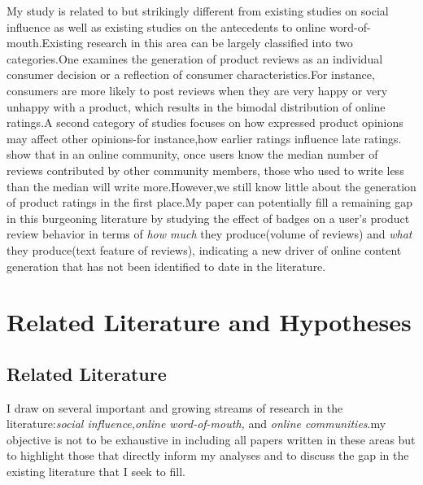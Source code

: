 \documentclass[12pt]{article}%
\begin{document}
My study is related to but strikingly different from existing studies on social influence as well as existing studies on the antecedents to online word-of-mouth.Existing research in this area can be largely classified into two categories.One examines the generation of product reviews as an individual consumer decision or a reflection of consumer characteristics.For instance, consumers are more likely to post reviews when they are very happy or very unhappy with a product, which results in the bimodal distribution of online ratings\citep{hu2006}.A second category of studies focuses on how expressed product opinions may affect other opinions-for instance,how earlier ratings influence late ratings.\cite{chen2010social} show that in an online community, once users know the median number of reviews contributed by other community members, those who used to write less than the median will write more.However,we still know little about the generation of product ratings in the first place.My paper can potentially fill a remaining gap in this burgeoning literature by studying the effect of badges on a user's product review behavior in terms of \emph{how much} they produce(volume of reviews) and \emph{what} they produce(text feature of reviews), indicating a new driver of online content generation that has not been identified to date in the literature. 



\section{Related Literature and  Hypotheses}
\label{Related}

\subsection{Related Literature}
I draw on several important and growing streams of research in the literature:\emph{social influence,online word-of-mouth,} and \emph {online communities}.my objective is not to be exhaustive in including all papers written in these areas but to highlight those that directly inform my analyses and to discuss the gap in the existing literature that I seek to fill.
\end{document}
